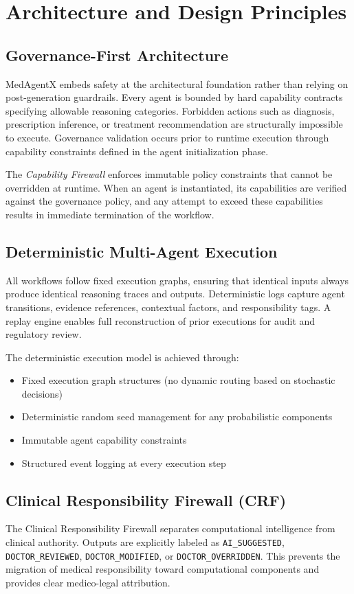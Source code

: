 \documentclass[conference]{IEEEtran}
\begin{document}
\section{Architecture and Design Principles}

\subsection{Governance-First Architecture}
MedAgentX embeds safety at the architectural foundation rather than relying on post-generation guardrails. Every agent is bounded by hard capability contracts specifying allowable reasoning categories. Forbidden actions such as diagnosis, prescription inference, or treatment recommendation are structurally impossible to execute. Governance validation occurs prior to runtime execution through capability constraints defined in the agent initialization phase.

The \textit{Capability Firewall} enforces immutable policy constraints that cannot be overridden at runtime. When an agent is instantiated, its capabilities are verified against the governance policy, and any attempt to exceed these capabilities results in immediate termination of the workflow.

\subsection{Deterministic Multi-Agent Execution}
All workflows follow fixed execution graphs, ensuring that identical inputs always produce identical reasoning traces and outputs. Deterministic logs capture agent transitions, evidence references, contextual factors, and responsibility tags. A replay engine enables full reconstruction of prior executions for audit and regulatory review.

The deterministic execution model is achieved through:
\begin{itemize}
    \item Fixed execution graph structures (no dynamic routing based on stochastic decisions)
    \item Deterministic random seed management for any probabilistic components
    \item Immutable agent capability constraints
    \item Structured event logging at every execution step
\end{itemize}

\subsection{Clinical Responsibility Firewall (CRF)}
The Clinical Responsibility Firewall separates computational intelligence from clinical authority. Outputs are explicitly labeled as \texttt{AI\_SUGGESTED}, \texttt{DOCTOR\_REVIEWED}, \texttt{DOCTOR\_MODIFIED}, or \texttt{DOCTOR\_OVERRIDDEN}. This prevents the migration of medical responsibility toward computational components and provides clear medico-legal attribution.
\end{document}
